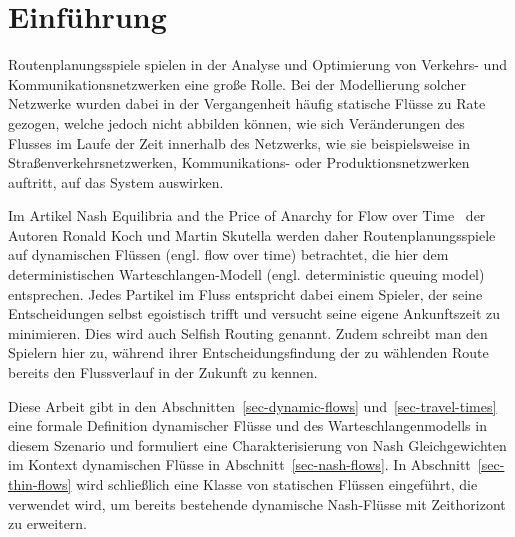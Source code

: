 \section{Einführung}\label{introduction}

Routenplanungsspiele spielen in der Analyse und Optimierung von Verkehrs- und Kommunikationsnetzwerken eine große Rolle.
Bei der Modellierung solcher Netzwerke wurden dabei in der Vergangenheit häufig statische Flüsse zu Rate gezogen, welche jedoch nicht abbilden können, wie sich Veränderungen des Flusses im Laufe der Zeit innerhalb des Netzwerks, wie sie beispielsweise in Straßenverkehrsnetzwerken, Kommunikations- oder Produktionsnetzwerken auftritt, auf das System auswirken.

Im Artikel \glqq Nash Equilibria and the Price of Anarchy for Flow over Time\grqq\ \cite{Koch2011} der Autoren Ronald Koch und Martin Skutella werden daher Routenplanungsspiele auf dynamischen Flüssen (engl. flow over time) betrachtet, die hier dem deterministischen Warte\-schlangen-Modell (engl. deterministic queuing model) entsprechen.
Jedes Partikel im Fluss entspricht dabei einem Spieler, der seine Entscheidungen selbst egoistisch trifft und versucht seine eigene Ankunftszeit zu minimieren.
Dies wird auch Selfish Routing genannt.
Zudem schreibt man den Spielern hier zu, während ihrer Entscheidungsfindung der zu wählenden Route bereits den Flussverlauf in der Zukunft zu kennen.

Diese Arbeit gibt in den Abschnitten~\ref{sec-dynamic-flows} und~\ref{sec-travel-times} eine formale Definition dynamischer Flüsse und des Warteschlangenmodells in diesem Szenario und formuliert eine Charakterisierung von Nash Gleichgewichten im Kontext dynamischen Flüsse in Abschnitt~\ref{sec-nash-flows}.
In Abschnitt~\ref{sec-thin-flows} wird schließlich eine Klasse von statischen Flüssen eingeführt, die verwendet wird, um bereits bestehende dynamische Nash-Flüsse mit Zeithorizont zu erweitern.